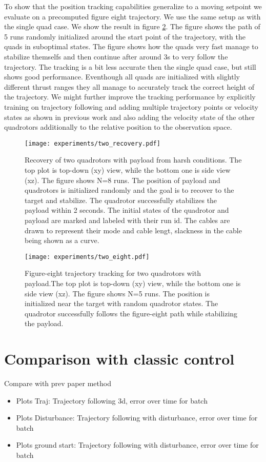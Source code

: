 To show that the position tracking capabilities generalize to a moving setpoint we evaluate on a precomputed figure eight trajectory. We use the same setup as with the single quad case. We show the result in figure \ref{fig:two_eight}. The figure shows the path of 5 runs randomly initialized around the start point of the trajectory, with the quads in suboptimal states. The figure shows how the quads very fast manage to stabilize themselfs and then continue after around 3s to very follow the trajectory. The tracking is a bit less accurate then the single quad case, but still shows good performance. Eventhough all quads are initialized with slightly different thrust ranges they all manage to accurately track the correct height of the trajectory. We might further improve the tracking performance by explicitly training on trajectory following and adding multiple trajectory points or velocity states as shown in previous work and also adding the velocity state of the other quadrotors additionally to the relative position to the observation space.
\begin{figure}[ht]
    \centering
    \texttt{[image: experiments/two\_recovery.pdf]}
    \caption{Recovery of two quadrotors with payload from harsh conditions. The top plot is top-down  (xy) view, while the bottom one is side view (xz).
    The figure shows N=8 runs. The position of payload and quadrotors is initialized randomly and the goal is to recover to the target and stabilize. The quadrotor successfully stabilizes the payload within 2 seconds. The initial states of the quadrotor and payload are marked and labeled with their run id. The cables are drawn to represent their mode and cable lengt, slackness in the cable being shown as a curve.}
    \label{fig:two_recovery}
\end{figure}
\begin{figure}[ht]
    \centering
    
    \texttt{[image: experiments/two\_eight.pdf]}
    \caption{Figure-eight trajectory tracking for two quadrotors with payload.The top plot is top-down  (xy) view, while the bottom one is side view (xz). The figure shows N=5 runs. The position is initialized near the target with random quadrotor states. The quadrotor successfully follows the figure-eight path while stabilizing the payload.}
    \label{fig:two_eight}
\end{figure}

\section{Comparison with classic control}
Compare with prev paper method \autocite{Wahba2024}
\begin{itemize}
    \item Plots Traj: Trajectory following 3d, error over time for batch
    \item Plots Disturbance: Trajectory following with disturbance, error over time for batch
    \item Plots ground start: Trajectory following with disturbance, error over time for batch
\end{itemize} 
